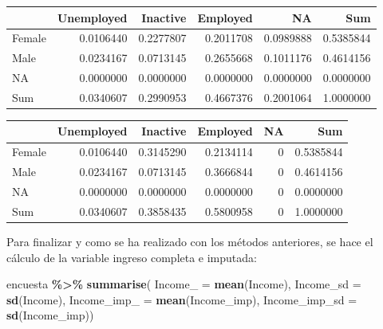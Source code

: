 \documentclass[
  spanish,
  12pt,
]{book}
\newenvironment{Shaded}{\begin{snugshade}}{\end{snugshade}}
\newcommand{\AttributeTok}[1]{\textcolor[rgb]{0.13,0.29,0.53}{#1}}
\newcommand{\FunctionTok}[1]{\textcolor[rgb]{0.13,0.29,0.53}{\textbf{#1}}}
\newcommand{\NormalTok}[1]{#1}
\newcommand{\SpecialCharTok}[1]{\textcolor[rgb]{0.81,0.36,0.00}{\textbf{#1}}}
\newcommand{\StringTok}[1]{\textcolor[rgb]{0.31,0.60,0.02}{#1}}
\begin{document}
\begin{tabular}{l|r|r|r|r|r}
\hline
  & Unemployed & Inactive & Employed & NA & Sum\\
\hline
Female & 0.0106440 & 0.2277807 & 0.2011708 & 0.0989888 & 0.5385844\\
\hline
Male & 0.0234167 & 0.0713145 & 0.2655668 & 0.1011176 & 0.4614156\\
\hline
NA & 0.0000000 & 0.0000000 & 0.0000000 & 0.0000000 & 0.0000000\\
\hline
Sum & 0.0340607 & 0.2990953 & 0.4667376 & 0.2001064 & 1.0000000\\
\hline
\end{tabular}

\begin{Shaded}
\end{Shaded}

\begin{tabular}{l|r|r|r|r|r}
\hline
  & Unemployed & Inactive & Employed & NA & Sum\\
\hline
Female & 0.0106440 & 0.3145290 & 0.2134114 & 0 & 0.5385844\\
\hline
Male & 0.0234167 & 0.0713145 & 0.3666844 & 0 & 0.4614156\\
\hline
NA & 0.0000000 & 0.0000000 & 0.0000000 & 0 & 0.0000000\\
\hline
Sum & 0.0340607 & 0.3858435 & 0.5800958 & 0 & 1.0000000\\
\hline
\end{tabular}

Para finalizar y como se ha realizado con los métodos anteriores, se hace el cálculo de la variable ingreso completa e imputada:

\begin{Shaded}
\begin{Highlighting}[]
\NormalTok{encuesta }\SpecialCharTok{\%\textgreater{}\%} \FunctionTok{summarise}\NormalTok{(}
  \AttributeTok{Income\_ =} \FunctionTok{mean}\NormalTok{(Income),}
  \AttributeTok{Income\_sd =} \FunctionTok{sd}\NormalTok{(Income),}
  \AttributeTok{Income\_imp\_ =} \FunctionTok{mean}\NormalTok{(Income\_imp),}
  \AttributeTok{Income\_imp\_sd =} \FunctionTok{sd}\NormalTok{(Income\_imp))}
\end{Highlighting}
\end{Shaded}
\end{document}
